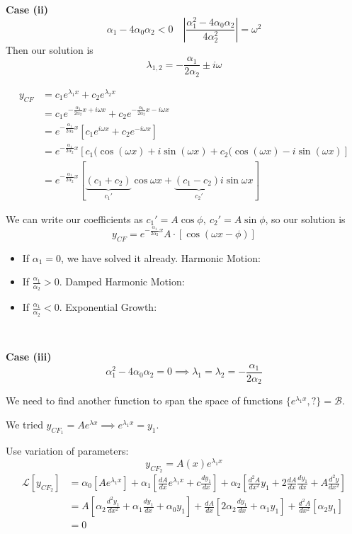 \documentclass[twoside]{scrartcl}
\begin{document}
\textbf{Case (ii)}
\[\alpha_1-4\alpha_0\alpha_2 < 0 \quad \left|\frac{\alpha_1^2-4\alpha_0\alpha_2}{4\alpha_2^2}\right| = \omega^2\]
Then our solution is
\[\lambda_{1,2} = -\frac{\alpha_1}{2\alpha_2} \pm i\omega\]

\[
\begin{aligned}
  y_{CF} &= c_1e^{\lambda_1x} + c_2e^{\lambda_2x}\\
  &= c_1 e^{-\frac{\alpha_1}{2\alpha_2}x + i\omega x} + c_2 e^{-\frac{\alpha_1}{2\alpha_2}x - i\omega x}\\
  &= e^{-\frac{\alpha_1}{2\alpha_2}x}[c_1e^{i\omega x} + c_2e^{-i\omega x}]\\
  &= e^{-\frac{\alpha_1}{2\alpha_2}x}\left[c_1(\cos(\omega x) + i\sin(\omega x) + c_2(\cos(\omega x) - i\sin(\omega x)\right]\\
  &= e^{-\frac{\alpha_1}{2\alpha_2}x}[\underbrace{(c_1+c_2)}_{c_1'}\cos\omega x + \underbrace{(c_1-c_2)i}_{c_2'}\sin\omega x]
\end{aligned}
\]

We can write our coefficients as $c_1' = A\cos\phi,~c_2' = A\sin\phi$, so our solution is 
\[y_{CF} = e^{-\frac{\alpha_1}{2\alpha_2}x}A\cdot[\cos(\omega x -\phi)]\]

\begin{itemize}
  \item If $\alpha_1 = 0$, we have solved it already. Harmonic Motion:
  \item If $\frac{\alpha_1}{\alpha_2} >0$. Damped Harmonic Motion:
  \item If $\frac{\alpha_1}{\alpha_2} <0$. Exponential Growth: 
\end{itemize}~

\textbf{Case (iii)}
\[\alpha_1^2 -4\alpha_0\alpha_2 = 0 \implies \lambda_1 = \lambda_2 = -\frac{\alpha_1}{2\alpha_2}\]

We need to find another function to span the space of functions $\{e^{\lambda_1x},?\} = \mathcal{B}$. 

We tried $y_{CF_1} = Ae^{\lambda x} \implies e^{\lambda_1 x} = y_1$. 

Use variation of parameters: 
\[y_{CF_2} = A(x)e^{\lambda_1x}\]
\[
\begin{aligned}
  \mathcal{L}[y_{CF_2}] &= \alpha_0[Ae^{\lambda_1x}] + \alpha_1\left[\frac{dA}{dx}e^{\lambda_1x} + c\frac{dy_1}{dx}\right] + \alpha_2\left[\frac{d^2A}{dx^2}y_1 + 2\frac{dA}{dx}\frac{dy_1}{dx} + A\frac{d^2y}{dx^2}\right]\\
  &= A\left[\alpha_2\frac{d^2y_1}{dx^2} + \alpha_1\frac{dy_1}{dx} + \alpha_0y_1\right] + \frac{dA}{dx}\left[2\alpha_2\frac{dy_1}{dx} + \alpha_1y_1\right] + \frac{d^2A}{dx^2}[\alpha_2y_1]\\
  &= 0
\end{aligned}
\]
\end{document}
